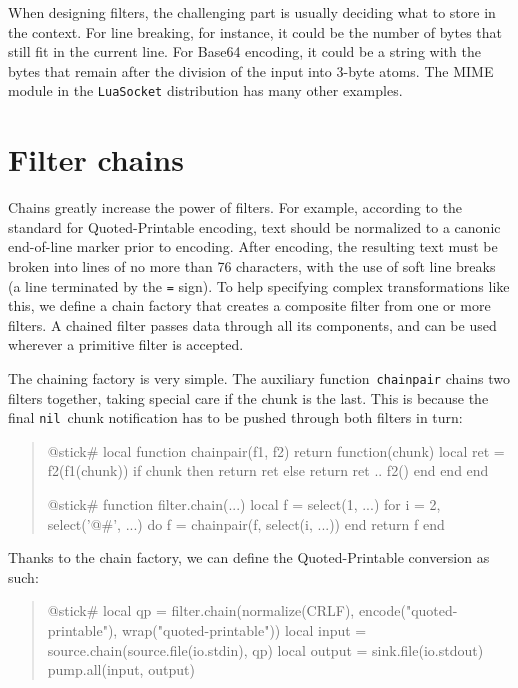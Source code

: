 \documentclass[10pt]{article}
\newcommand{\nil}{\texttt{nil}}
\begin{document}
			When designing filters, the challenging part is usually 
			deciding what to store in the context. For line breaking, for
			instance, it could be the number of bytes that still fit in the
			current line.  For Base64 encoding, it could be a string
			with the bytes that remain after the division of the input
			into 3-byte atoms. The MIME module in the \texttt{LuaSocket}
			distribution has many other examples. 
			
			\section{Filter chains}
			
			Chains greatly increase the power of filters.  For example,
			according to the standard for Quoted-Printable encoding,
			text should be normalized to a canonic end-of-line marker
			prior to encoding.  After encoding, the resulting text must
			be broken into lines of no more than 76 characters, with the
			use of soft line breaks (a line terminated by the \texttt{=}
			sign).  To help specifying complex transformations like
			this, we define a chain factory that creates a composite
			filter from one or more filters.  A chained filter passes
			data through all its components, and can be used wherever a
			primitive filter is accepted.
			
			The chaining factory is very simple. The auxiliary
			function~\texttt{chainpair} chains two filters together,
			taking special care if the chunk is the last.  This is
			because the final \nil\ chunk notification has to be
			pushed through both filters in turn:  
			\begin{quote}
			\begin{lua}
			@stick#
			local function chainpair(f1, f2)
            return function(chunk)
        local ret = f2(f1(chunk))
        if chunk then return ret
        else return ret .. f2() end
            end
			end
			
			@stick#
			function filter.chain(...)
            local f = select(1, ...) 
            for i = 2, select('@#', ...) do
        f = chainpair(f, select(i, ...))
            end
            return f
			end
			\end{lua}
			\end{quote}
			
			Thanks to the chain factory, we can
			define the Quoted-Printable conversion as such:
			\begin{quote}
			\begin{lua}
			@stick#
			local qp = filter.chain(normalize(CRLF), encode("quoted-printable"), 
            wrap("quoted-printable"))
			local input = source.chain(source.file(io.stdin), qp)
			local output = sink.file(io.stdout)
			pump.all(input, output)
			\end{lua}
			\end{quote}
			
\end{document}
